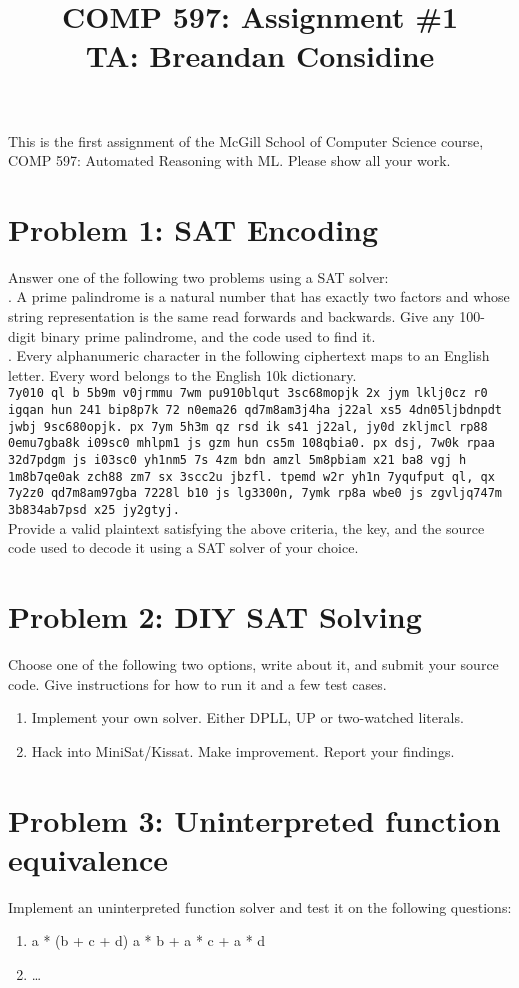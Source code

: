\documentclass[11pt]{article}
\title{COMP 597: Assignment \#1\\\vspace{10pt}\small{TA: Breandan Considine}}
\begin{document}
    \maketitle
    \noindent This is the first assignment of the McGill School of Computer Science course, COMP 597: Automated Reasoning with ML. Please show all your work.

    \section{Problem 1: SAT Encoding}

    \noindent Answer one of the following two problems using a SAT solver:\\

    . A prime palindrome is a natural number that has exactly two factors and whose string representation is the same read forwards and backwards. Give any 100-digit binary prime palindrome, and the code used to find it.\\

    . Every alphanumeric character in the following ciphertext maps to an English letter. Every word belongs to the English 10k dictionary.\\

        \noindent \texttt{7y010 ql b 5b9m v0jrmmu 7wm pu910blqut 3sc68mopjk 2x jym lklj0cz r0 igqan hun 241 bip8p7k 72 n0ema26 qd7m8am3j4ha j22al xs5 4dn05ljbdnpdt jwbj 9sc680opjk. px 7ym 5h3m qz rsd ik s41 j22al, jy0d zkljmcl rp88 0emu7gba8k i09sc0 mhlpm1 js gzm hun cs5m 108qbia0. px dsj, 7w0k rpaa 32d7pdgm js i03sc0 yh1nm5 7s 4zm bdn amzl 5m8pbiam x21 ba8 vgj h 1m8b7qe0ak zch88 zm7 sx 3scc2u jbzfl. tpemd w2r yh1n 7yqufput ql, qx 7y2z0 qd7m8am97gba 7228l b10 js lg3300n, 7ymk rp8a wbe0 js zgvljq747m 3b834ab7psd x25 jy2gtyj.}\\

    \noindent Provide a valid plaintext satisfying the above criteria, the key, and the source code used to decode it using a SAT solver of your choice.

    \pagebreak\section{Problem 2: DIY SAT Solving}

    \noindent Choose one of the following two options, write about it, and submit your source code. Give instructions for how to run it and a few test cases.

    \begin{enumerate}
    \item Implement your own solver. Either DPLL, UP or two-watched literals.
    \item Hack into MiniSat/Kissat. Make improvement. Report your findings.
    \end{enumerate}

    \section {Problem 3: Uninterpreted function equivalence}
    \noindent Implement an uninterpreted function solver and test it on the following questions:
    \begin{enumerate}
        \item a * (b + c + d)  a * b + a * c + a * d
        \item \ldots
    \end{enumerate}
\end{document}

